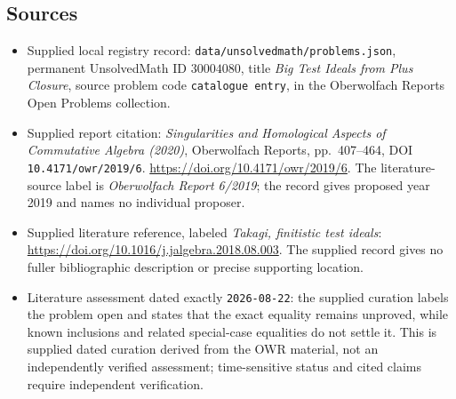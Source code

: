 \documentclass[11pt]{article}
\begin{document}
\subsection{Sources}
\begin{itemize}
\item Supplied local registry record: \texttt{data/unsolvedmath/problems.json}, permanent UnsolvedMath ID \(30004080\), title \emph{Big Test Ideals from Plus Closure}, source problem code \texttt{catalogue entry}, in the Oberwolfach Reports Open Problems collection.
\item Supplied report citation: \emph{Singularities and Homological Aspects of Commutative Algebra (2020)}, Oberwolfach Reports, pp.~407--464, DOI \texttt{10.4171/owr/2019/6}. \url{https://doi.org/10.4171/owr/2019/6}. The literature-source label is \emph{Oberwolfach Report 6/2019}; the record gives proposed year 2019 and names no individual proposer.
\item Supplied literature reference, labeled \emph{Takagi, finitistic test ideals}: \url{https://doi.org/10.1016/j.jalgebra.2018.08.003}. The supplied record gives no fuller bibliographic description or precise supporting location.
\item Literature assessment dated exactly \texttt{2026-08-22}: the supplied curation labels the problem open and states that the exact equality remains unproved, while known inclusions and related special-case equalities do not settle it. This is supplied dated curation derived from the OWR material, not an independently verified assessment; time-sensitive status and cited claims require independent verification.
\end{itemize}
\end{document}
